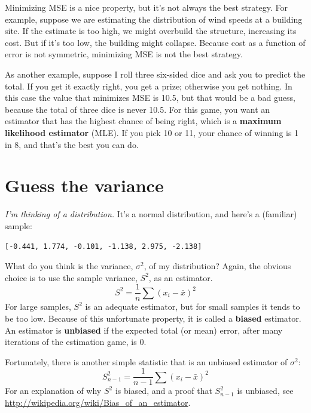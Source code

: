 \documentclass[12pt]{book}
\newcommand{\xbar}{\bar{x}}
\theoremstyle{exercise}
\begin{document}
Minimizing MSE is a nice property, but it's not always the best
strategy.  For example, suppose we are estimating the distribution of
wind speeds at a building site.  If the estimate is too high, we might
overbuild the structure, increasing its cost.  But if it's too
low, the building might collapse.  Because cost as a function of
error is not symmetric, minimizing MSE is not the best strategy.%
%
%

As another example, suppose I roll three six-sided dice and ask you to
predict the total.  If you get it exactly right, you get a prize;
otherwise you get nothing.  In this case the value that minimizes MSE
is 10.5, but that would be a bad guess, because the total of three
dice is never 10.5.  For this game, you want an estimator that has the
highest chance of being right, which is a {\bf maximum likelihood
  estimator} (MLE).  If you pick 10 or 11, your chance of winning is 1
in 8, and that's the best you can do.%
%
%


\section{Guess the variance}%
%
%
%
%

{\em I'm thinking of a distribution\/.}  It's a normal distribution, and 
here's a (familiar) sample:

{\tt [-0.441, 1.774, -0.101, -1.138, 2.975, -2.138]}

What do you think is the variance, $\sigma^2$, of my distribution?
Again, the obvious choice is to use the sample variance, $S^2$, as an
estimator.
%
\[ S^2 = \frac{1}{n} \sum (x_i - \xbar)^2 \] 
%
For large samples, $S^2$ is an adequate estimator, but for small
samples it tends to be too low.  Because of this unfortunate
property, it is called a {\bf biased} estimator.
An estimator is {\bf unbiased} if the expected total (or mean) error,
after many iterations of the estimation game, is 0.%
%
%
%
%

Fortunately, there is another simple statistic that is an unbiased
estimator of $\sigma^2$:
%
\[ S_{n-1}^2 = \frac{1}{n-1} \sum (x_i - \xbar)^2 \] 
%
For an explanation of why $S^2$ is biased, and a proof that
$S_{n-1}^2$ is unbiased, see
\url{http://wikipedia.org/wiki/Bias_of_an_estimator}.
\end{document}
